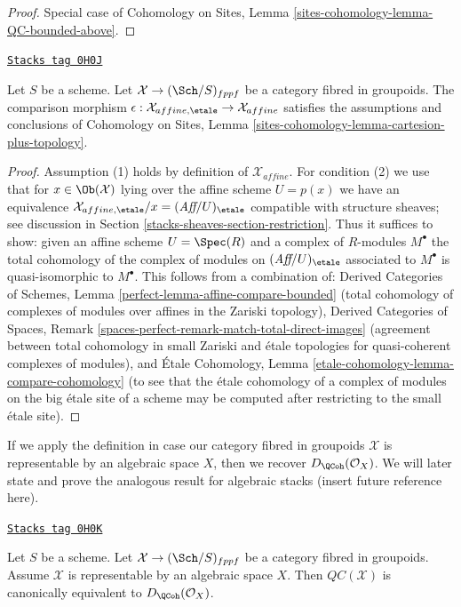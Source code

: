 \begin{proof}
Special case of
Cohomology on Sites, Lemma \ref{sites-cohomology-lemma-QC-bounded-above}.
\end{proof}

\begin{lemma}[QC compare]
\label{stacks-sheaves-lemma-QC-compare}
\href{https://stacks.math.columbia.edu/tag/0H0J}{\texttt{Stacks tag 0H0J}}

Let $S$ be a scheme. Let $\mathcal{X} \to (\Sch/S)_{fppf}$ be a category
fibred in groupoids. The comparison morphism
$\epsilon : \mathcal{X}_{affine, \etale} \to \mathcal{X}_{affine}$
satisfies the assumptions and conclusions of Cohomology on Sites, Lemma
\ref{sites-cohomology-lemma-cartesion-plus-topology}.
\end{lemma}

\begin{proof}
Assumption (1) holds by definition of $\mathcal{X}_{affine}$.
For condition (2) we use that for $x \in \Ob(\mathcal{X})$
lying over the affine scheme $U = p(x)$ we have an equivalence
$\mathcal{X}_{affine, \etale}/x = (\textit{Aff}/U)_\etale$ compatible
with structure sheaves; see
discussion in Section \ref{stacks-sheaves-section-restriction}.
Thus it suffices to show: given an affine scheme $U = \Spec(R)$
and a complex of $R$-modules $M^\bullet$ the total cohomology
of the complex of modules on $(\textit{Aff}/U)_\etale$
associated to $M^\bullet$ is quasi-isomorphic to $M^\bullet$.
This follows from a combination of:
Derived Categories of Schemes, Lemma
\ref{perfect-lemma-affine-compare-bounded} (total cohomology of complexes
of modules over affines in the Zariski topology),
Derived Categories of Spaces, Remark
\ref{spaces-perfect-remark-match-total-direct-images}
(agreement between total cohomology in small
Zariski and \'etale topologies for
quasi-coherent complexes of modules), and
\'Etale Cohomology, Lemma \ref{etale-cohomology-lemma-compare-cohomology}
(to see that the \'etale cohomology of a complex of modules
on the big \'etale site of a scheme
may be computed after restricting to the small \'etale site).
\end{proof}

If we apply the definition in case our category fibred in groupoids
$\mathcal{X}$ is representable by an algebraic space $X$, then we
recover $D_\QCoh(\mathcal{O}_X)$. We will later state and prove the
analogous result for algebraic stacks (insert future reference here).

\begin{proposition}[QC compare]
\label{stacks-sheaves-proposition-QC-compare}
\href{https://stacks.math.columbia.edu/tag/0H0K}{\texttt{Stacks tag 0H0K}}

Let $S$ be a scheme. Let $\mathcal{X} \to (\Sch/S)_{fppf}$ be a category
fibred in groupoids. Assume $\mathcal{X}$ is representable by an algebraic
space $X$. Then $\mathit{QC}(\mathcal{X})$ is canonically equivalent to
$D_\QCoh(\mathcal{O}_X)$.
\end{proposition}

